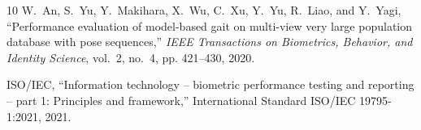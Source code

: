 \documentclass[journal]{IEEEtran}
\begin{document}
\begin{thebibliography}{10}
W.~An, S.~Yu, Y.~Makihara, X.~Wu, C.~Xu, Y.~Yu, R.~Liao, and Y.~Yagi,
  ``Performance evaluation of model-based gait on multi-view very large
  population database with pose sequences,'' \emph{IEEE Transactions on
  Biometrics, Behavior, and Identity Science}, vol.~2, no.~4, pp. 421--430,
  2020.

{ISO/IEC}, ``Information technology -- biometric performance testing and
  reporting -- part 1: Principles and framework,'' International Standard
  ISO/IEC 19795-1:2021, 2021.

\end{thebibliography}
\end{document}
